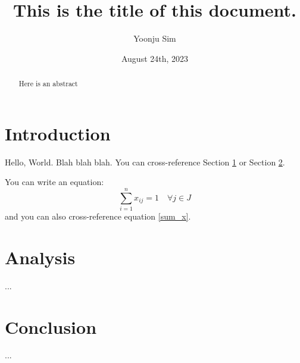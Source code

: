 \documentclass[letterpaper, 11pt]{article}
\title{This is the title of this document.}
\author{Yoonju Sim}
\date{August 24th, 2023}
\begin{document}
\maketitle

\begin{abstract}
Here is an abstract
\end{abstract}


\section{Introduction} \label{sec:intro}

Hello, World. Blah blah blah. You can cross-reference Section \ref{sec:intro} or Section \ref{sec:analysis}. 

You can write an equation:
\begin{equation}
\sum_{i=1}^n x_{ij} = 1 \quad \forall j \in J \label{sum_x}
\end{equation}
and you can also cross-reference equation \eqref{sum_x}.


\section{Analysis} \label{sec:analysis}

...

\section{Conclusion} \label{sec:conclusion}

...
\end{document}
